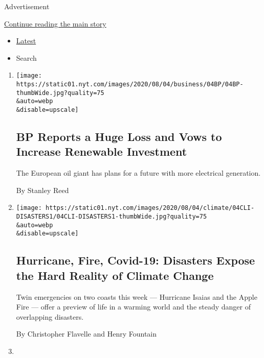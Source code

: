Advertisement

\protect\hyperlink{after-mid1}{Continue reading the main story}

\begin{itemize}
\tightlist
\item
  \protect\hyperlink{stream-panel}{Latest}
\item
  Search
\end{itemize}

\begin{enumerate}
\def\labelenumi{\arabic{enumi}.}
\item
  \href{/2020/08/04/business/energy-environment/bp-renewable-investment.html}{}

  \texttt{[image: https://static01.nyt.com/images/2020/08/04/business/04BP/04BP-thumbWide.jpg?quality=75\\\&auto=webp\\\&disable=upscale]}

  \hypertarget{bp-reports-a-huge-loss-and-vows-to-increase-renewable-investment}{%
  \subsection{BP Reports a Huge Loss and Vows to Increase Renewable
  Investment}\label{bp-reports-a-huge-loss-and-vows-to-increase-renewable-investment}}

  The European oil giant has plans for a future with more electrical
  generation.

  By Stanley Reed
\item
  \href{/2020/08/04/climate/hurricane-isaias-apple-fire-climate.html}{}

  \texttt{[image: https://static01.nyt.com/images/2020/08/04/climate/04CLI-DISASTERS1/04CLI-DISASTERS1-thumbWide.jpg?quality=75\\\&auto=webp\\\&disable=upscale]}

  \hypertarget{hurricane-fire-covid-19-disasters-expose-the-hard-reality-of-climate-change}{%
  \subsection{Hurricane, Fire, Covid-19: Disasters Expose the Hard
  Reality of Climate
  Change}\label{hurricane-fire-covid-19-disasters-expose-the-hard-reality-of-climate-change}}

  Twin emergencies on two coasts this week --- Hurricane Isaias and the
  Apple Fire --- offer a preview of life in a warming world and the
  steady danger of overlapping disasters.

  By Christopher Flavelle and Henry Fountain
\item
  \href{/2020/08/04/books/review/migrations-charlotte-mcconaghy.html}{}


\end{enumerate}
